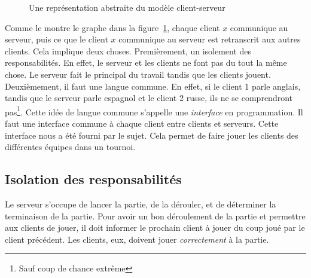 \begin{figure}[H]
	\centering
	\caption{Une représentation abstraite du modèle client-serveur}
	\label{fig:repr-serveur}
\end{figure}

Comme le montre le graphe dans la figure~\ref{fig:repr-serveur}, 
chaque client $x$ communique au serveur, puis ce que le client $x$ communique au serveur est retranscrit  aux autres clients.
Cela implique deux choses. Premièrement, un isolement des responsabilités. En effet, le serveur
et les clients ne font pas du tout la même chose. Le serveur fait le principal du travail tandis que les clients jouent.
Deuxièmement, il faut une langue commune. En effet, si le client 1 parle anglais, tandis que le serveur parle espagnol et le client 2 russe,
ils ne se comprendront pas\footnote{Sauf coup de chance extrême}. Cette idée de langue
commune s'appelle une \emph{interface} en programmation. Il faut une interface
commune à chaque client entre clients et serveurs. Cette interface nous a été fourni par le sujet. Cela permet
de faire jouer les clients des différentes équipes dans un tournoi.

\subsection{Isolation des responsabilités}

Le serveur s'occupe de lancer la partie, de la dérouler, et de déterminer la terminaison de la partie.
Pour avoir un bon déroulement de la partie et permettre aux clients de jouer,
il doit informer le prochain client à jouer du coup joué par le client précédent.
Les clients, eux, doivent jouer \emph{correctement} à la partie.

